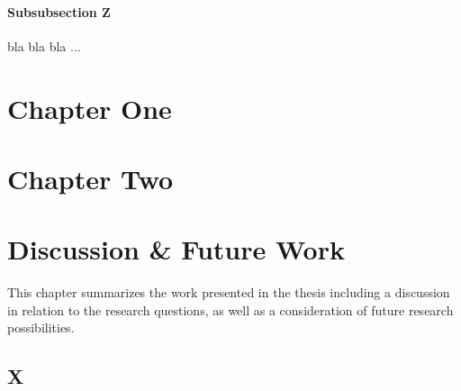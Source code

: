 \subsubsection{Subsubsection Z}
bla bla bla ...




 {

\chapter{Chapter One}
\label{chap:ChapterOne}
 { }

\chapter{Chapter Two}
\label{chap:ChapterTwo}
 { }

}


\chapter{Discussion \& Future Work}
This chapter summarizes the work presented in the thesis including a discussion in relation to the research questions, as well as a consideration of future research possibilities.

\section{X}





%    
%    

    \cleardoublepage 
    
        
    
    
    \cleardoublepage 
    \listoffigures

    \cleardoublepage 
    \listoftables





%